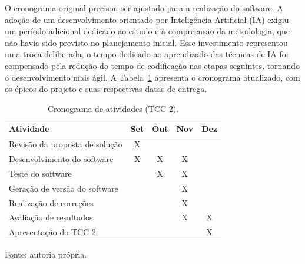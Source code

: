 O cronograma original precisou ser ajustado para a realização do software. A adoção de um desenvolvimento orientado por Inteligência Artificial (IA) exigiu um período adicional dedicado ao estudo e à compreensão da metodologia, que não havia sido previsto no planejamento inicial. Esse investimento representou uma troca deliberada, o tempo dedicado ao aprendizado das técnicas de IA foi compensado pela redução do tempo de codificação nas etapas seguintes, tornando o desenvolvimento mais ágil. A Tabela~\ref{tab:cronograma} apresenta o cronograma atualizado, com os épicos do projeto e suas respectivas datas de entrega.

\renewcommand{\arraystretch}{1.5}
\begin{table}[H]
    \centering
    \caption{Cronograma de atividades (TCC 2).}
    \label{tab:cronograma}

    \begin{tabularx}{\textwidth}{|X|c|c|c|c|}
        \hline
        \textbf{Atividade} & \textbf{Set} & \textbf{Out} & \textbf{Nov} & \textbf{Dez} \\
        \hline
        Revisão da proposta de solução & X &   &   &   \\
        \hline
        Desenvolvimento do software   & X & X & X &   \\
        \hline
        Teste do software            &   & X  & X &  \\
        \hline
        Geração de versão do software &  &   & X &   \\
        \hline
        Realização de correções        &   &   & X &  \\
        \hline
        Avaliação de resultados        &   &   & X  & X \\
        \hline
        Apresentação do TCC 2          &   &   &   & X  \\
        \hline
    \end{tabularx}

    \vspace{0.5em}
    \small Fonte: autoria própria.
\end{table}